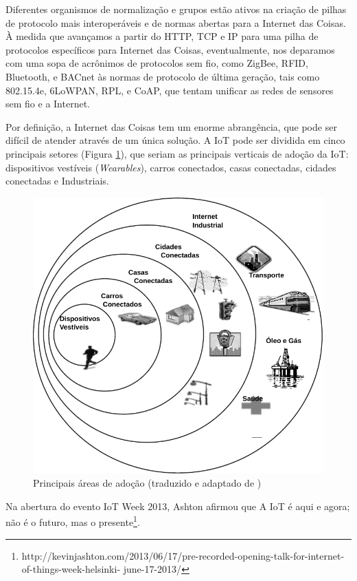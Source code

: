 Diferentes organismos de normalização e grupos estão ativos na criação
de pilhas de protocolo mais interoperáveis e de normas abertas para
a Internet das Coisas. À medida que avançamos a partir do HTTP, TCP
e IP para uma pilha de protocolos específicos para Internet das Coisas,
eventualmente, nos deparamos com uma sopa de acrônimos de protocolos
sem fio, como ZigBee, RFID, Bluetooth, e BACnet às normas de protocolo
de última geração, tais como 802.15.4e, 6LoWPAN, RPL, e CoAP, que
tentam unificar as redes de sensores sem fio e a Internet\cite{electronicdesign:2016}. 

Por definição, a Internet das Coisas tem um enorme abrangência, que
pode ser difícil de atender através de um única solução. A IoT pode
ser dividida em cinco principais setores (Figura \ref{fig:iot-report}),
que seriam as principais verticais de adoção da IoT\cite{Goldman2014}:
dispositivos vestíveis (\emph{Wearables}), carros conectados, casas
conectadas, cidades conectadas e Industriais.

\begin{figure}
\begin{centering}
\includegraphics[width=0.7\linewidth]{Imagens/Cap_2/iot-report}
\par\end{centering}
\caption[Principais áreas de adoção]{ Principais áreas de adoção (traduzido e adaptado de \cite{Goldman2014})\label{fig:iot-report}}
\end{figure}

Na abertura do evento IoT Week 2013, Ashton afirmou que \textquotedbl{}A
IoT é aqui e agora; não é o futuro, mas o presente\textquotedbl{}\footnote{http://kevinjashton.com/2013/06/17/pre-recorded-opening-talk-for-internet-of-things-week-helsinki-
june-17-2013/}.


